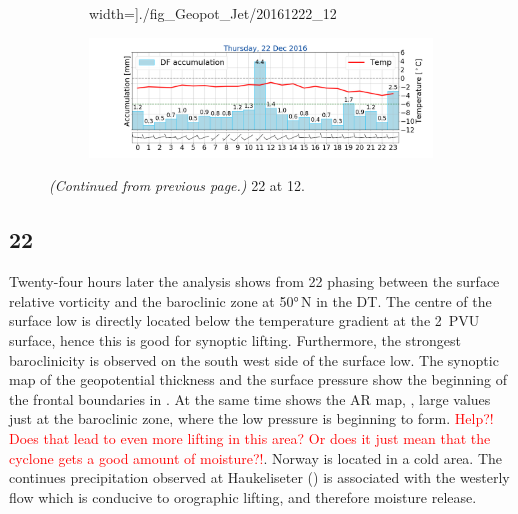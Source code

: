 \begin{figure}
\begin{subfigure}[b]{0.49\textwidth}
		width=\textwidth]{./fig_Geopot_Jet/20161222_12}
		\caption{} \label{fig:GP22}
	\end{subfigure}
	\begin{subfigure}[b]{0.49\textwidth}
		\includegraphics[trim={4.9cm 1.cm 1.5cm 1cm},clip,
		width=\textwidth]{./fig_weathermast/T_P_U_20161222}
		\caption{} \label{fig:TPU22}
	\end{subfigure}
\caption{\textit{(Continued from previous page.)} \SI{22}{\dec} at \SI{12}{\UTC}.}
\end{figure}
\subsection*{\SI{22}{\dec}}
\noindent Twenty-four hours later the analysis shows from \SI{22}{\dec} phasing between the surface relative vorticity and the baroclinic zone at \ang{50}{\,N} in the DT. The centre of the surface low is directly located below the temperature gradient at the \SI{2}{PVU} surface, hence this is good for synoptic lifting. Furthermore, the strongest baroclinicity is observed on the south west side of the surface low.
The synoptic map of the geopotential thickness and the surface pressure show the beginning of the frontal boundaries in . 
At the same time shows the AR map, , large values just at the baroclinic zone, where the low pressure is beginning to form. \textcolor{red}{Help?! Does that lead to even more lifting in this area? Or does it just mean that the cyclone gets a good amount of moisture?!}.
Norway is located in a cold area. The continues precipitation observed at Haukeliseter () is associated with the westerly flow which is conducive to orographic lifting, and therefore moisture release.  


